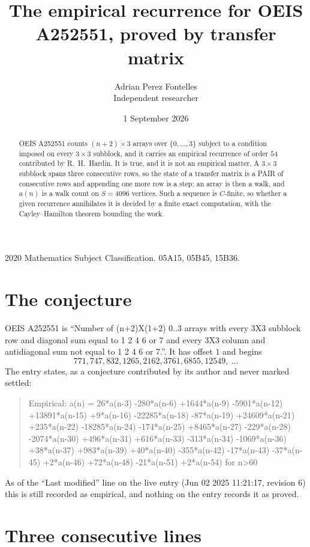 \documentclass[11pt,a4paper]{article}
\title{The empirical recurrence for OEIS A252551, proved by transfer matrix}
\author{Adrian Perez Fontelles\\ \small Independent researcher}
\date{1 September 2026}
\theoremstyle{plain}
\theoremstyle{definition}
\begin{document}
\maketitle

\begin{abstract}
OEIS A252551 counts $(n+2)\times3$ arrays over $\{0,\dots,3\}$ subject to a condition imposed on
every $3\times3$ subblock, and it carries an empirical recurrence of order $54$
contributed by R.~H.~Hardin. It is true, and it is not an empirical matter. A $3\times3$
subblock spans three consecutive rows, so the state of a transfer matrix is a PAIR of
consecutive rows and appending one more row is a step; an array is then a walk, and
$a(n)$ is a walk count on $S=4096$ vertices. Such a sequence is $C$-finite, so whether a given
recurrence annihilates it is decided by a finite exact computation, with the Cayley--Hamilton
theorem bounding the work.
\end{abstract}

\noindent\small 2020 Mathematics Subject Classification. 05A15, 05B45, 15B36.\normalsize

\section{The conjecture}

OEIS A252551 is ``Number of (n+2)X(1+2) 0..3 arrays with every 3X3 subblock row and diagonal sum equal to 1 2 4 6 or 7 and every 3X3 column and antidiagonal sum not equal to 1 2 4 6 or 7.''. It has offset $1$ and begins
\[
771, 747, 832, 1265, 2162, 3761, 6855, 12549,\ \dots
\]
The entry states, as a conjecture contributed by its author and never marked settled:
\begin{quote}
Empirical: a(n) = 26*a(n-3) -280*a(n-6) +1644*a(n-9) -5901*a(n-12) +13891*a(n-15) +9*a(n-16) -22285*a(n-18) -87*a(n-19) +24609*a(n-21) +235*a(n-22) -18285*a(n-24) -174*a(n-25) +8465*a(n-27) -229*a(n-28) -2074*a(n-30) +496*a(n-31) +616*a(n-33) -313*a(n-34) -1069*a(n-36) +38*a(n-37) +983*a(n-39) +40*a(n-40) -355*a(n-42) -17*a(n-43) -37*a(n-45) +2*a(n-46) +72*a(n-48) -21*a(n-51) +2*a(n-54) for n>60
\end{quote}
As of the ``Last modified'' line on the live entry (Jun 02 2025 11:21:17, revision 6) this is still
recorded as empirical, and nothing on the entry records it as proved.

\section{Three consecutive lines}
\end{document}

